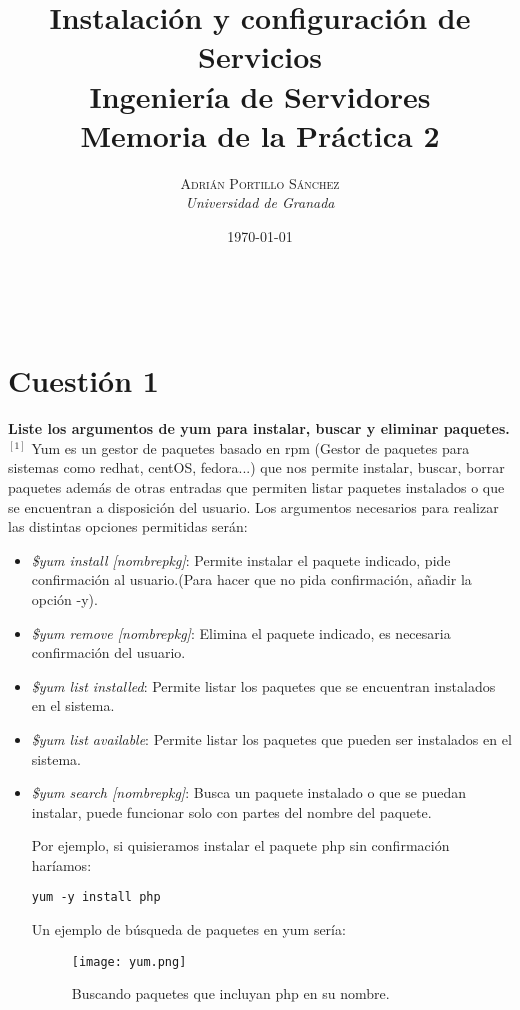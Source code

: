 \documentclass[a4paper, 11pt]{article} %
\title{\textbf{Instalación y configuración de Servicios}\\ %
\vspace{20 pt}
Ingeniería de Servidores \\Memoria de la Práctica 2} %
\author{\textsc{Adrián Portillo Sánchez} %
\\{\textit{Universidad de Granada}}} %
\date{\today} %
\makeatletter
\renewcommand{\maketitle}{ %
\begin{center} %
{\Huge\@title} %
\end{center}

\vspace{20pt} %

\begin{flushright} %
{\large\@author} %
\\\@date %

\vspace{40pt} %
\end{flushright}
}
\makeatother
\begin{document}
\maketitle
\pagebreak
\tableofcontents
\listoffigures
\pagebreak

\section{Cuestión 1}
\textbf{Liste los argumentos de yum para instalar, buscar y eliminar paquetes.}\\

$^{[1]}$ Yum es un gestor de paquetes basado en rpm (Gestor de paquetes para sistemas como redhat, centOS, fedora...) que nos permite instalar, buscar, borrar paquetes además de otras entradas que permiten listar paquetes instalados o que se encuentran a disposición del usuario. Los argumentos necesarios para realizar las distintas opciones permitidas serán:
\begin{itemize}
\item \textit{\$yum install [nombrepkg]}: Permite instalar el paquete indicado, pide confirmación al usuario.(Para hacer que no pida confirmación, añadir la opción -y).
\item \textit{\$yum remove [nombrepkg]}: Elimina el paquete indicado, es necesaria confirmación del usuario.
\item \textit{\$yum list installed}: Permite listar los paquetes que se encuentran instalados en el sistema.
\item \textit{\$yum list available}: Permite listar los paquetes que pueden ser instalados en el sistema.
\item \textit{\$yum search [nombrepkg]}: Busca un paquete instalado o que se puedan instalar, puede funcionar solo con partes del nombre del paquete.

Por ejemplo, si quisieramos instalar el paquete php sin confirmación haríamos:
\begin{verbatim}
yum -y install php
\end{verbatim}

\pagebreak

Un ejemplo de búsqueda de paquetes en yum sería:
\begin{figure}[h]
\centering 
\texttt{[image: yum.png]} 
\caption{Buscando paquetes que incluyan php en su nombre.} 
\vspace{-0.5cm}
\label{contexto:figura} 
\end{figure}

\end{itemize}
\end{document}
